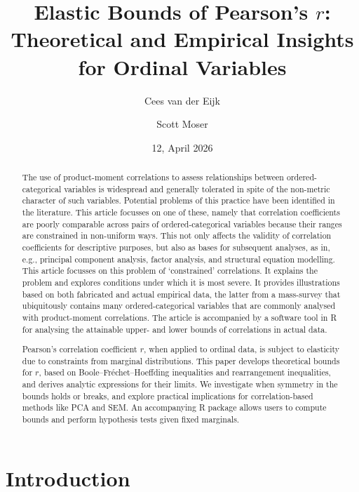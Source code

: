 \documentclass[
  12pt,
]{article}
\title{Elastic Bounds of Pearson's \(r\): Theoretical and Empirical
Insights for Ordinal Variables}
\author{Cees van der Eijk \and Scott Moser}
\date{12, April 2026}
\theoremstyle{plain}
\theoremstyle{definition}
\renewcommand*\contentsname{Table of contents}
\newcommand\contentsname{Table of contents}
\theoremstyle{remark}
\begin{document}
\maketitle

\renewcommand*\contentsname{Table of contents}
{
\hypersetup{linkcolor=}
\setcounter{tocdepth}{3}
\tableofcontents
}

\newpage

\begin{abstract}
The use of product-moment correlations to assess relationships between ordered-categorical variables is widespread and generally tolerated in spite of the non-metric character of such variables. Potential problems of this practice have been identified in the literature. This article focusses on one of these, namely that correlation coefficients are poorly comparable across pairs of ordered-categorical variables because their ranges are constrained in non-uniform ways. This not only affects the validity of correlation coefficients for descriptive purposes, but also as bases for subsequent analyses, as in, e.g., principal component analysis, factor analysis, and structural equation modelling. This article focusses on this problem of ‘constrained’ correlations. It explains the problem and explores conditions under which it is most severe. It provides illustrations based on both fabricated and actual empirical data, the latter from a mass-survey that ubiquitously contains many ordered-categorical variables that are commonly analysed with product-moment correlations. The article is accompanied by a software tool in R for analysing the attainable upper- and lower bounds of correlations in actual data. 

Pearson’s correlation coefficient $r$, when applied to ordinal data, is subject to elasticity due to constraints from marginal distributions. This paper develops theoretical bounds for $r$, based on Boole–Fréchet–Hoeffding inequalities and rearrangement inequalities, and derives analytic expressions for their limits. We investigate when symmetry in the bounds holds or breaks, and explore practical implications for correlation-based methods like PCA and SEM. An accompanying R package allows users to compute bounds and perform hypothesis tests given fixed marginals.
\end{abstract}

\newpage

\newpage

\section{Introduction}\label{sec-intro}
\end{document}
